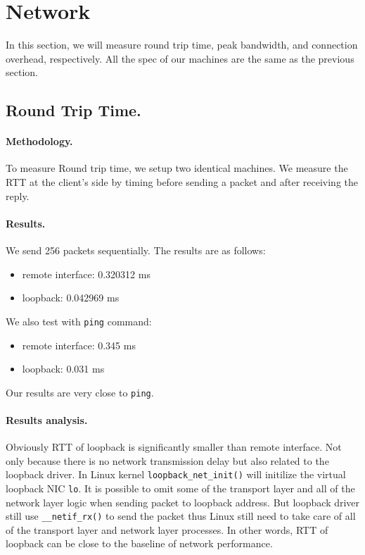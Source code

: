 \section{Network}
In this section, we will measure round trip time, peak bandwidth, and connection overhead, respectively. All the spec of our machines are the same as the previous section.

\subsection{Round Trip Time.}
\paragraph{Methodology.} To measure Round trip time, we setup two identical machines. We measure the RTT at the client's side by timing before sending a packet and after receiving the reply.

\paragraph{Results.}
We send 256 packets sequentially. The results are as follows:
\begin{itemize}[leftmargin=*]
	\item remote interface: 0.320312 ms
	\item loopback: 0.042969 ms
\end{itemize}
We also test with \texttt{ping} command:
\begin{itemize}[leftmargin=*]
	\item remote interface: 0.345 ms
	\item loopback: 0.031 ms
\end{itemize}
Our results are very close to \texttt{ping}.

\paragraph{Results analysis.} Obviously RTT of loopback is significantly smaller than remote interface. Not only because there is no network transmission delay but also related to the loopback driver. In Linux kernel \texttt{loopback\_net\_init()} will initilize the virtual loopback NIC \texttt{lo}. It is possible to omit some of the transport layer and all of the network layer logic when sending packet to loopback address. But loopback driver still use \texttt{\_\_netif\_rx()} to send the packet thus Linux still need to take care of all of the transport layer and network layer processes. In other words, RTT of loopback can be close to the baseline of network performance.

